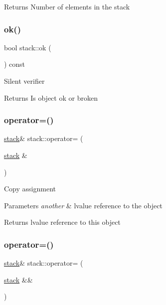 \begin{DoxyReturn}{Returns}
Number of elements in the stack 
\end{DoxyReturn}
\mbox{\label{classstack_a12bb4c544eb6cc7ca43cab1a8616d3db}} 
\subsubsection{\texorpdfstring{ok()}{ok()}}
{\footnotesize\ttfamily bool stack\+::ok (\begin{DoxyParamCaption}{ }\end{DoxyParamCaption}) const}

Silent verifier

\begin{DoxyReturn}{Returns}
Is object ok or broken 
\end{DoxyReturn}
\mbox{\label{classstack_a405cb40f99da46e1ae97076c544866fb}} 
\subsubsection{\texorpdfstring{operator=()}{operator=()}\hspace{0.1cm}{\footnotesize\ttfamily [1/2]}}
{\footnotesize\ttfamily \hyperlink{classstack}{stack}\& stack\+::operator= (\begin{DoxyParamCaption}\item[{\hyperlink{classstack}{stack} \&}]{ }\end{DoxyParamCaption})}

Copy assignment


\begin{DoxyParams}{Parameters}
{\em another} & lvalue reference to the object\\
\hline
\end{DoxyParams}
\begin{DoxyReturn}{Returns}
lvalue reference to this object 
\end{DoxyReturn}
\mbox{\label{classstack_a413ffacb608eaa8b838bfbe078c7b554}} 
\subsubsection{\texorpdfstring{operator=()}{operator=()}\hspace{0.1cm}{\footnotesize\ttfamily [2/2]}}
{\footnotesize\ttfamily \hyperlink{classstack}{stack}\& stack\+::operator= (\begin{DoxyParamCaption}\item[{\hyperlink{classstack}{stack} \&\&}]{ }\end{DoxyParamCaption})}

